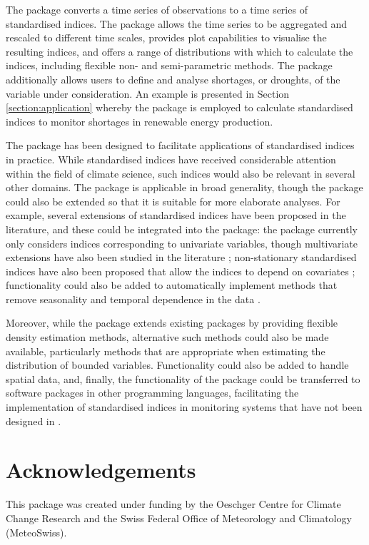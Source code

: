 \documentclass[article,shortnames,nojss]{jss}\usepackage[]{graphicx}\usepackage[]{xcolor}
\begin{document}
The  package converts a time series of observations to a time series of standardised indices. The package allows the time series to be aggregated and rescaled to different time scales, provides plot capabilities to visualise the resulting indices, and offers a range of distributions with which to calculate the indices, including flexible non- and semi-parametric methods. The package additionally allows users to define and analyse shortages, or droughts, of the variable under consideration. An example is presented in Section \ref{section:application} whereby the package is employed to calculate standardised indices to monitor shortages in renewable energy production.

The package has been designed to facilitate applications of standardised indices in practice. While standardised indices have received considerable attention within the field of climate science, such indices would also be relevant in several other domains. The  package is applicable in broad generality, though the package could also be extended so that it is suitable for more elaborate analyses. For example, several extensions of standardised indices have been proposed in the literature, and these could be integrated into the package: the package currently only considers indices corresponding to univariate variables, though multivariate extensions have also been studied in the literature \citep[e.g.][]{ErhardtCzado2018,HaoEtAl2019}; non-stationary standardised indices have also been proposed that allow the indices to depend on covariates \citep{RussoEtAl2013,LiEtAl2015}; functionality could also be added to automatically implement methods that remove seasonality and temporal dependence in the data \citep{ErhardtCzado2018}. %


Moreover, while the package extends existing packages by providing flexible density estimation methods, alternative such methods could also be made available, particularly methods that are appropriate when estimating the distribution of bounded variables. Functionality could also be added to handle spatial data, and, finally, the functionality of the package could be transferred to software packages in other programming languages, facilitating the implementation of standardised indices in monitoring systems that have not been designed in .

\section*{Acknowledgements}

This package was created under funding by the Oeschger Centre for Climate Change Research and the Swiss Federal Office of Meteorology and Climatology (MeteoSwiss).


\end{document}
